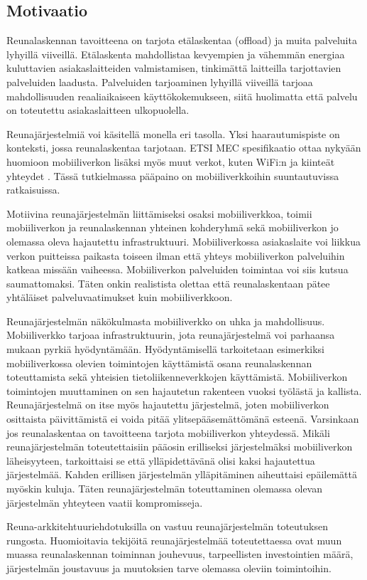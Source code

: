 \subsection{Motivaatio}
Reunalaskennan tavoitteena on tarjota etälaskentaa (offload) ja muita palveluita lyhyillä viiveillä. 
Etälaskenta mahdollistaa kevyempien ja vähemmän energiaa kuluttavien asiakaslaitteiden valmistamisen, tinkimättä laitteilla tarjottavien palveluiden laadusta.
Palveluiden tarjoaminen lyhyillä viiveillä tarjoaa mahdollisuuden reaaliaikaiseen käyttökokemukseen, siitä huolimatta että palvelu on toteutettu asiakaslaitteen ulkopuolella. 

Reunajärjestelmiä voi käsitellä monella eri tasolla. Yksi haarautumispiste on  konteksti, jossa reunalaskentaa tarjotaan. ETSI MEC spesifikaatio ottaa nykyään huomioon mobiiliverkon lisäksi myös muut verkot, kuten WiFi:n ja kiinteät yhteydet \cite{taleb2017multi}. Tässä tutkielmassa pääpaino on mobiiliverkkoihin suuntautuvissa ratkaisuissa.

Motiivina reunajärjestelmän liittämiseksi osaksi mobiiliverkkoa, toimii mobiiliverkon ja reunalaskennan yhteinen kohderyhmä sekä mobiiliverkon jo olemassa oleva hajautettu infrastruktuuri.
Mobiiliverkossa asiakaslaite voi liikkua verkon puitteissa paikasta toiseen ilman että yhteys mobiiliverkon palveluihin katkeaa missään vaiheessa. Mobiiliverkon palveluiden toimintaa voi siis kutsua saumattomaksi. 
Täten onkin realistista olettaa että reunalaskentaan pätee yhtäläiset palveluvaatimukset kuin mobiiliverkkoon.

Reunajärjestelmän näkökulmasta mobiiliverkko on uhka ja mahdollisuus. Mobiiliverkko tarjoaa infrastruktuurin, jota reunajärjestelmä voi parhaansa mukaan pyrkiä hyödyntämään.
Hyödyntämisellä tarkoitetaan esimerkiksi mobiiliverkossa olevien toimintojen käyttämistä osana reunalaskennan toteuttamista sekä yhteisien tietoliikenneverkkojen käyttämistä.
Mobiiliverkon toimintojen muuttaminen on sen hajautetun rakenteen vuoksi työlästä ja kallista. 
Reunajärjestelmä on itse myös hajautettu järjestelmä, joten mobiiliverkon osittaista päivittämistä ei voida pitää ylitsepääsemättömänä esteenä. Varsinkaan jos reunalaskentaa on tavoitteena tarjota mobiiliverkon yhteydessä. 
Mikäli reunajärjestelmän toteutettaisiin pääosin erilliseksi järjestelmäksi mobiiliverkon läheisyyteen, tarkoittaisi se että ylläpidettävänä olisi kaksi hajautettua järjestelmää. 
Kahden erillisen järjestelmän ylläpitäminen aiheuttaisi epäilemättä myöskin kuluja.
Täten reunajärjestelmän toteuttaminen olemassa olevan järjestelmän yhteyteen vaatii kompromisseja.


Reuna-arkkitehtuuriehdotuksilla on vastuu reunajärjestelmän toteutuksen rungosta.
Huomioitavia tekijöitä reunajärjestelmää toteutettaessa ovat muun muassa reunalaskennan toiminnan jouhevuus, tarpeellisten investointien määrä, järjestelmän joustavuus ja muutoksien tarve olemassa oleviin toimintoihin.
